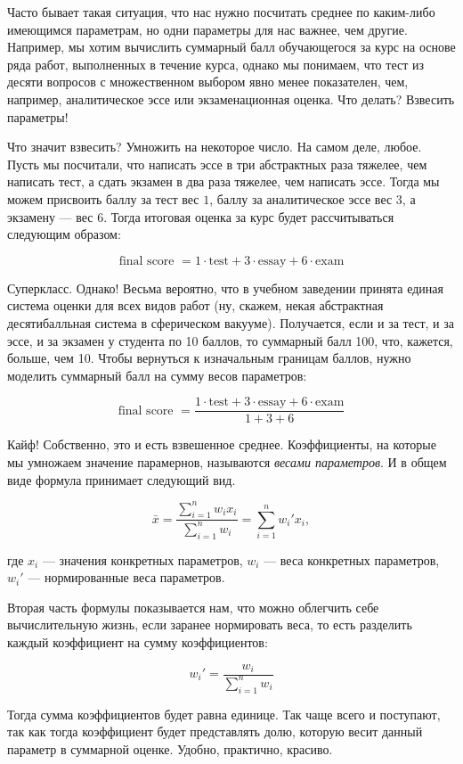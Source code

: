 \documentclass[
  letterpaper,
  DIV=11,
  numbers=noendperiod]{scrreprt}
\theoremstyle{definition}
\theoremstyle{remark}
\begin{document}
Часто бывает такая ситуация, что нас нужно посчитать среднее по
каким-либо имеющимся параметрам, но одни параметры для нас важнее, чем
другие. Например, мы хотим вычислить суммарный балл обучающегося за курс
на основе ряда работ, выполненных в течение курса, однако мы понимаем,
что тест из десяти вопросов с множественном выбором явно менее
показателен, чем, например, аналитическое эссе или экзаменационная
оценка. Что делать? Взвесить параметры!

Что значит взвесить? Умножить на некоторое число. На самом деле, любое.
Пусть мы посчитали, что написать эссе в три абстрактных раза тяжелее,
чем написать тест, а сдать экзамен в два раза тяжелее, чем написать
эссе. Тогда мы можем присвоить баллу за тест вес \(1\), баллу за
аналитическое эссе вес \(3\), а экзамену --- вес \(6\). Тогда итоговая
оценка за курс будет рассчитываться следующим образом:

\[
\text{final score } = 1 \cdot \text{test} + 3 \cdot \text{essay} + 6 \cdot \text{exam}
\]

Суперкласс. Однако! Весьма вероятно, что в учебном заведении принята
единая система оценки для всех видов работ (ну, скажем, некая
абстрактная десятибалльная система в сферическом вакууме). Получается,
если и за тест, и за эссе, и за экзамен у студента по 10 баллов, то
суммарный балл 100, что, кажется, больше, чем 10. Чтобы вернуться к
изначальным границам баллов, нужно моделить суммарный балл на сумму
весов параметров:

\[
\text{final score } = \frac{1 \cdot \text{test} + 3 \cdot \text{essay} + 6 \cdot \text{exam}}{1 + 3 + 6}
\]

Кайф! Собственно, это и есть взвешенное среднее. Коэффициенты, на
которые мы умножаем значение парамернов, называются \emph{весами
параметров}. И в общем виде формула принимает следующий вид.

\[
\bar x = \frac{\sum_{i=1}^n w_i x_i}{\sum_{i=1}^n w_i} = \sum_{i=1}^n w_i' x_i,
\]

где \(x_i\) --- значения конкретных параметров, \(w_i\) --- веса
конкретных параметров, \(w_i'\) --- нормированные веса параметров.

Вторая часть формулы показывается нам, что можно облегчить себе
вычислительную жизнь, если заранее нормировать веса, то есть разделить
каждый коэффициент на сумму коэффициентов:

\[
w_i' = \frac{w_i}{\sum_{i=1}^n w_i}
\]

Тогда сумма коэффициентов будет равна единице. Так чаще всего и
поступают, так как тогда коэффициент будет представлять долю, которую
весит данный параметр в суммарной оценке. Удобно, практично, красиво.
\end{document}
